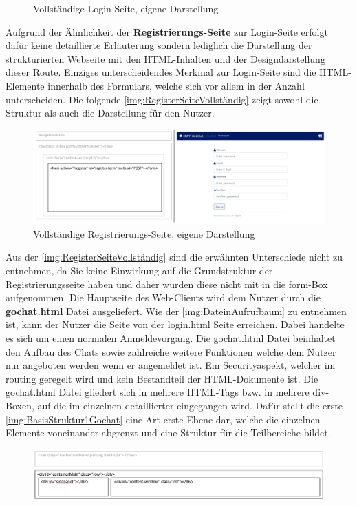\documentclass[a4paper,titlepage,halfparskip,12pt]{scrreprt}
\begin{document}
\begin{onehalfspacing}
\begin{figure}[h]
	\caption{Vollständige Login-Seite, eigene Darstellung}
	\label{img:LoginSeiteVollständig}
\end{figure}
Aufgrund der Ähnlichkeit der \textbf{Registrierungs-Seite} zur Login-Seite erfolgt dafür keine detaillierte Erläuterung sondern lediglich die Darstellung der strukturierten Webseite mit den HTML-Inhalten und der Designdarstellung dieser Route. Einziges unterscheidendes Merkmal zur Login-Seite sind die HTML-Elemente innerhalb des Formulars, welche sich vor allem in der Anzahl unterscheiden. Die folgende \autoref{img:RegisterSeiteVollständig} zeigt sowohl die Struktur als auch die Darstellung für den Nutzer.
\begin{figure}[h]
	\centering
	\includegraphics[width=\linewidth]{images/RegisterPage}
	\caption{Vollständige Registrierungs-Seite, eigene Darstellung}
	\label{img:RegisterSeiteVollständig}
\end{figure}
Aus der \autoref{img:RegisterSeiteVollständig} sind die erwähnten Unterschiede nicht zu entnehmen, da Sie keine Einwirkung auf die Grundstruktur der Registrierungsseite haben und daher wurden diese nicht mit in die form-Box aufgenommen. Die Hauptseite des Web-Clients wird dem Nutzer durch die \textbf{gochat.html} Datei ausgeliefert. Wie der \autoref{img:DateinAufrufbaum} zu entnehmen ist, kann der Nutzer die Seite von der login.html Seite erreichen. Dabei handelte es sich um einen normalen Anmeldevorgang. Die gochat.html Datei beinhaltet den Aufbau des Chats sowie zahlreiche weitere Funktionen welche dem Nutzer nur angeboten werden wenn er angemeldet ist. Ein Securityaspekt, welcher im routing geregelt wird und kein Bestandteil der HTML-Dokumente ist. Die gochat.html Datei gliedert sich in mehrere HTML-Tags bzw. in mehrere div-Boxen, auf die im einzelnen detaillierter eingegangen wird. Dafür stellt die erste \autoref{img:BasisStruktur1Gochat} eine Art erste Ebene dar, welche die einzelnen Elemente voneinander abgrenzt und eine Struktur für die Teilbereiche bildet.
\begin{figure}[h]
	\centering
	\includegraphics[width=\linewidth]{images/BasisStruktur1Gochat}

\end{figure}
\end{onehalfspacing}
\end{document}
